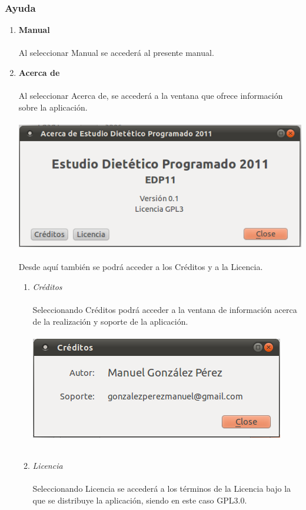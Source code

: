 \documentclass[12pt, spanish]{article}
\begin{document}
\subsubsection{Ayuda}
\begin{enumerate}
\item \textbf{Manual}\\\\
Al seleccionar Manual se accederá al presente manual.\\
\item \textbf{Acerca de}\\\\
Al seleccionar Acerca de, se accederá a la ventana que ofrece información sobre la aplicación.\\\\
\includegraphics[scale=0.5]{Image/acercade.png}\\\\
Desde aquí también se podrá acceder a los Créditos y a la Licencia.\\
\begin{enumerate}
\item \textit{Créditos}\\\\
Seleccionando Créditos podrá acceder a la ventana de información acerca de la realización y soporte de la aplicación.\\\\
\includegraphics[scale=0.5]{Image/creditos.png}\\\\
\item \textit{Licencia}\\\\
Seleccionando Licencia se accederá a los términos de la Licencia bajo la que se distribuye la aplicación, siendo en este caso GPL3.0.\\\\
\end{enumerate}
\end{enumerate}
\end{document}
